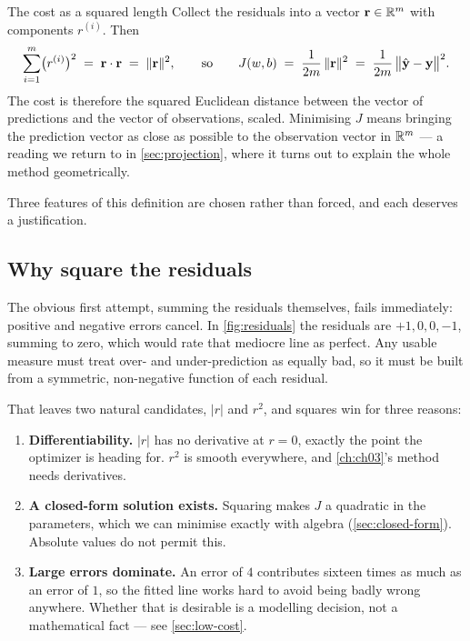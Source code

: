 \begin{derivation}{The cost as a squared length}
Collect the residuals into a vector $\mathbf{r}\in\mathbb{R}^{m}$ with components
$r^{(i)}$. Then
\[
  \sum_{i=1}^{m}\bigl(r^{(i)}\bigr)^{2}
  \;=\; \mathbf{r}\cdot\mathbf{r}
  \;=\; \|\mathbf{r}\|^{2},
  \qquad\text{so}\qquad
  J(w,b) \;=\; \frac{1}{2m}\,\|\mathbf{r}\|^{2}
         \;=\; \frac{1}{2m}\,\bigl\|\hat{\mathbf{y}} - \mathbf{y}\bigr\|^{2}.
\]
The cost is therefore the squared Euclidean distance between the vector of
predictions and the vector of observations, scaled. Minimising $J$ means
bringing the prediction vector as close as possible to the observation vector in
$\mathbb{R}^{m}$ --- a reading we return to in \cref{sec:projection}, where it turns
out to explain the whole method geometrically.
\end{derivation}

Three features of this definition are chosen rather than forced, and each
deserves a justification.

\subsection{Why square the residuals}

The obvious first attempt, summing the residuals themselves, fails immediately:
positive and negative errors cancel. In \cref{fig:residuals} the residuals are
$+1, 0, 0, -1$, summing to zero, which would rate that mediocre line as perfect.
Any usable measure must treat over- and under-prediction as equally bad, so it
must be built from a symmetric, non-negative function of each residual.

That leaves two natural candidates, $|r|$ and $r^{2}$, and squares win for three
reasons:

\begin{enumerate}
  \item \textbf{Differentiability.} $|r|$ has no derivative at $r = 0$, exactly
        the point the optimizer is heading for. $r^{2}$ is smooth everywhere,
        and \cref{ch:ch03}'s method needs derivatives.
  \item \textbf{A closed-form solution exists.} Squaring makes $J$ a quadratic
        in the parameters, which we can minimise exactly with algebra
        (\cref{sec:closed-form}). Absolute values do not permit this.
  \item \textbf{Large errors dominate.} An error of $4$ contributes sixteen
        times as much as an error of $1$, so the fitted line works hard to avoid
        being badly wrong anywhere. Whether that is desirable is a modelling
        decision, not a mathematical fact --- see \cref{sec:low-cost}.
\end{enumerate}

